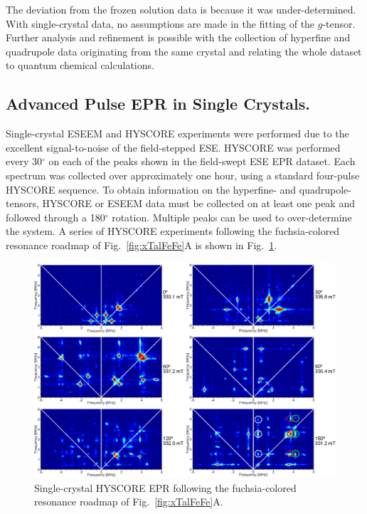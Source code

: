 The deviation from the frozen solution data is because it was under-determined. With single-crystal data, no assumptions are made in the fitting of the $g$-tensor. Further analysis and refinement is possible with the collection of hyperfine and quadrupole data originating from the same crystal and relating the whole dataset to quantum chemical calculations.

\subsection{Advanced Pulse EPR in Single Crystals.}
Single-crystal ESEEM and HYSCORE experiments were performed due to the excellent signal-to-noise of the field-stepped ESE. HYSCORE was performed every 30$^{\circ}$ on each of the peaks shown in the field-swept ESE EPR dataset. Each spectrum was collected over approximately one hour, using a standard four-pulse HYSCORE sequence. \cite{schweiger2001principles} To obtain information on the hyperfine- and quadrupole-tensors, HYSCORE or ESEEM data must be collected on at least one peak and followed through a 180$^{\circ}$ rotation. Multiple peaks can be used to over-determine the system. A series of HYSCORE experiments following the fuchsia-colored resonance roadmap of Fig.~\ref{fig:xTalFeFe}A is shown in Fig.~\ref{fig:FeFeHYSCOREFollow}. 

\begin{figure}[ht]
\centering
 \includegraphics[width=\textwidth]{Kapitel/Ch5-Images/FeFe-FollowHyscore.eps}
 \caption[Single-crystal HYSCORE EPR following a single peak.]{Single-crystal HYSCORE EPR following the fuchsia-colored resonance roadmap of Fig.~\ref{fig:xTalFeFe}A.} \label{fig:FeFeHYSCOREFollow}
\end{figure}

